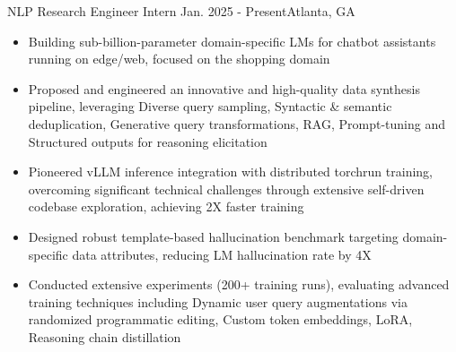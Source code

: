     {NLP Research Engineer Intern}
    {Jan. 2025 - Present}{Atlanta, GA}
\begin{itemize}
    \item Building sub-billion-parameter domain-specific LMs for chatbot assistants running on edge/web, focused on the shopping domain

    \item Proposed and engineered an innovative and high-quality data synthesis pipeline,
    leveraging Diverse query sampling, Syntactic \& semantic deduplication,
    Generative query transformations,
    RAG, Prompt-tuning and Structured outputs for reasoning elicitation


    \item Pioneered vLLM inference integration with distributed torchrun training,
    overcoming significant technical challenges
    through extensive self-driven codebase exploration,
    achieving 2X faster training



    \item Designed robust template-based hallucination benchmark targeting domain-specific data attributes,
    reducing LM hallucination rate by 4X

    \item Conducted extensive experiments (200+ training runs), evaluating advanced training techniques including
    Dynamic user query augmentations via randomized programmatic editing,
    Custom token embeddings, LoRA, Reasoning chain distillation


\end{itemize}
